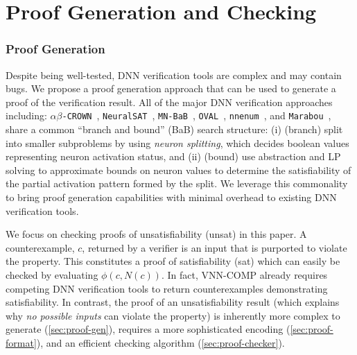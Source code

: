 \documentclass[oneside,11pt,dvipsnames]{book}
\newcommand{\prooftool}{\textsf{NNV-ProofGen}}
\newcommand{\crown}{\texttt{$\alpha\beta$-CROWN}}
\newcommand{\nnenum}{\texttt{nnenum}}
\newcommand{\marabou}{\texttt{Marabou}}
\newcommand{\ovalnnv}{\texttt{OVAL}}
\newcommand{\mnbab}{\texttt{MN-BaB}}
\newcommand{\neuralsat}{\texttt{NeuralSAT}}
\begin{document}

\part{Proof Generation and Checking}

\section{Proof Generation}\label{sec:proofgen}


Despite being well-tested, DNN verification tools are complex and may contain bugs. We propose a proof generation approach that can be used to generate a proof of the verification result. 
All of the major DNN verification approaches including: \crown{}~\cite{wang2021beta}, \neuralsat{}~\cite{duong2023dpllt}, \mnbab{}~\cite{ferrari2022complete}, \ovalnnv{}~\cite{ovalbab}, \nnenum{}~\cite{bak2021nnenum}, and \marabou{}~\cite{katz2019marabou}, share a common ``branch and bound'' (BaB) search structure: (i) (branch) split into smaller subproblems by using \emph{neuron splitting}, which decides boolean values representing neuron activation status, and (ii) (bound) use abstraction and LP solving to approximate bounds on neuron values to determine the satisfiability of the partial activation pattern formed by the split.
We leverage this commonality to bring proof generation capabilities with minimal overhead to existing DNN verification tools.

We focus on checking proofs of unsatisfiability (unsat) in this paper. 
A counterexample, $c$, returned by a verifier is an input that is purported to violate
the property.
This constitutes a proof of satisfiability (sat) 
which can easily be checked by evaluating $\phi(c,N(c))$.
In fact, VNN-COMP already requires competing DNN verification tools to return counterexamples demonstrating satisfiability.  In contrast, the proof of an unsatisfiability result (which explains why \emph{no possible inputs} can violate the property) is inherently more complex to generate (\autoref{sec:proof-gen}), requires a more sophisticated encoding (\autoref{sec:proof-format}), and an efficient checking algorithm (\autoref{sec:proof-checker}).
\end{document}
